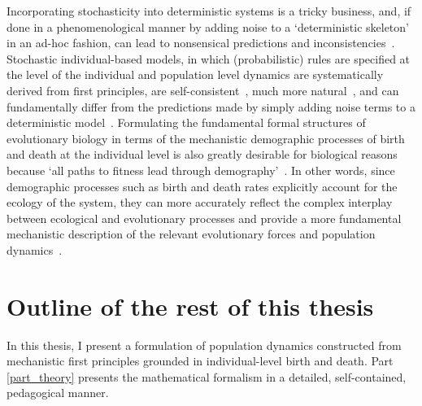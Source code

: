 Incorporating stochasticity into deterministic systems is a tricky business, and, if done in a phenomenological manner by adding noise to a `deterministic skeleton'~\citep{coulson_skeletons_2004} in an ad-hoc fashion, can lead to nonsensical predictions and inconsistencies~\citep{strang_how_2019}. Stochastic individual-based models, in which (probabilistic) rules are specified at the level of the individual and population level dynamics are systematically derived from first principles, are self-consistent~\citep{strang_how_2019}, much more natural~\citep{black_stochastic_2012}, and can fundamentally differ from the predictions made by simply adding noise terms to a deterministic model~\citep{strang_how_2019}. Formulating the fundamental formal structures of evolutionary biology in terms of the mechanistic demographic processes of birth and death at the individual level is also greatly desirable for biological reasons~\citep{metcalf_why_2007,geritz_mathematical_2012} because `all paths to fitness lead through demography'~\citep{metcalf_all_2007}. In other words, since demographic processes such as birth and death rates explicitly account for the ecology of the system, they can more accurately reflect the complex interplay between ecological and evolutionary processes and provide a more fundamental mechanistic description of the relevant evolutionary forces and population dynamics~\citep{doebeli_towards_2017}. 

\section{Outline of the rest of this thesis}

In this thesis, I present a formulation of population dynamics constructed from mechanistic first principles grounded in individual-level birth and death. Part \ref{part_theory} presents the mathematical formalism in a detailed, self-contained, pedagogical manner.

